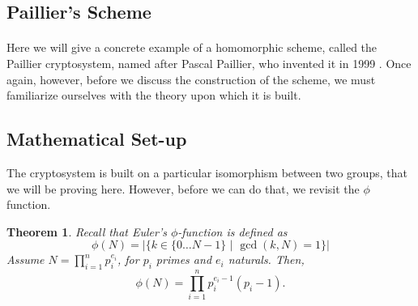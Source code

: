 \documentclass{article}
\newtheorem{theorem}{Theorem}[section]
\theoremstyle{definition}
\begin{document}
\subsection{Paillier's Scheme}
\paragraph{}
Here we will give a concrete example of a homomorphic scheme, called the Paillier
cryptosystem, named after Pascal Paillier, who invented it in 1999
\cite{paillier1999public}. Once again, however, before we discuss the
construction of the scheme, we must familiarize ourselves with the theory upon
which it is built.
\subsection{Mathematical Set-up}
The cryptosystem is built on a particular isomorphism between two groups, that
we will be proving here. However, before we can do that, we revisit the $\phi$
function.
\begin{theorem}
  \label{thm:phiformula}
  Recall that Euler's $\phi$-function is defined as
  \[
    \phi(N) = |\{k \in \{0\hdots N - 1\} \,\,|\,\, \gcd(k, N) = 1\}|
  \]
  Assume $N = \prod_{i = 1}^n p_i^{e_i}$, for $p_i$ primes and $e_i$ naturals. Then,
  \[
    \phi(N) = \prod_{i = 1}^n p_i^{e_i - 1} (p_i - 1).
  \]
\end{theorem}
\end{document}
